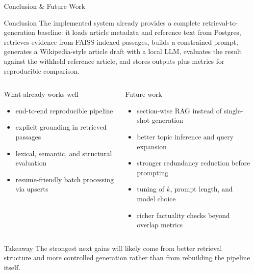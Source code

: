 \documentclass[aspectratio=169,12pt]{beamer}
\begin{document}
\begin{frame}[t]{Conclusion \& Future Work}
\vspace{-0.10cm}
\hspace*{-0.025\textwidth}%
\begin{minipage}{1.05\textwidth}
\begin{block}{Conclusion}
\justifying\scriptsize
The implemented system already provides a complete retrieval-to-generation baseline: it loads article metadata and reference text from Postgres, retrieves evidence from FAISS-indexed passages, builds a constrained prompt, generates a Wikipedia-style article draft with a local LLM, evaluates the result against the withheld reference article, and stores outputs plus metrics for reproducible comparison.
\end{block}

\vspace{0.08cm}
\begin{columns}[T,totalwidth=\linewidth,onlytextwidth]
\begin{block}{What already works well}
\scriptsize
\begin{itemize}
  \item end-to-end reproducible pipeline
  \item explicit grounding in retrieved passages
  \item lexical, semantic, and structural evaluation
  \item resume-friendly batch processing via upserts
\end{itemize}
\end{block}

\begin{block}{Future work}
\scriptsize
\begin{itemize}
  \item section-wise RAG instead of single-shot generation
  \item better topic inference and query expansion
  \item stronger redundancy reduction before prompting
  \item tuning of $k$, prompt length, and model choice
  \item richer factuality checks beyond overlap metrics
\end{itemize}
\end{block}
\end{columns}

\vspace{0.04cm}
\begin{alertblock}{Takeaway}
\scriptsize
The strongest next gains will likely come from better retrieval structure and more controlled generation rather than from rebuilding the pipeline itself.
\end{alertblock}
\end{minipage}
\end{frame}
\end{document}
